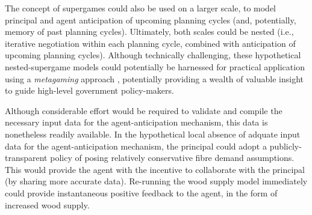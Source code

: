 The concept of supergames could also be used on a larger scale, to model principal and agent anticipation of upcoming planning cycles (and, potentially, memory of past planning cycles). Ultimately, both scales could be nested (i.e., iterative negotiation within each planning cycle, combined with anticipation of upcoming planning cycles). Although technically challenging, these hypothetical nested-supergame models could potentially be harnessed for practical application using a \emph{metagaming} approach \citep{howard1971paradoxes}, potentially providing a wealth of valuable insight to guide high-level government policy-makers.

Although considerable effort would be required to validate and compile the necessary input data for the agent-anticipation mechanism, this data is nonetheless readily available. In the hypothetical local absence of adquate input data for the agent-anticipation mechanism, the principal could adopt a publicly-transparent policy of posing relatively conservative fibre demand assumptions. This would provide the agent with the incentive to collaborate with the principal (by sharing more accurate data). Re-running the wood supply model immediately could provide instantaneous positive feedback to the agent, in the form of increased wood supply.





